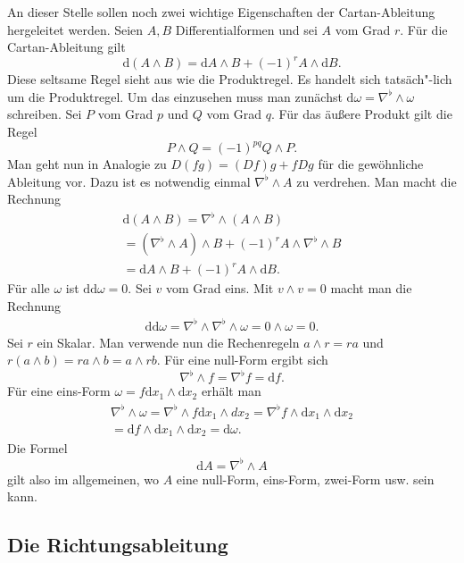 \documentclass[a4paper,10pt,fleqn,twocolumn,twoside]{article}
\begin{document}
An dieser Stelle sollen noch zwei wichtige Eigenschaften der
Cartan-Ableitung hergeleitet werden. Seien \(A,B\) Differentialformen
und sei \(A\) vom Grad \(r\). Für die Cartan-Ableitung gilt
\[\mathrm d(A\wedge B)
= \mathrm dA\wedge B + (-1)^r A\wedge \mathrm dB.\]
Diese seltsame Regel sieht aus wie die Produktregel. Es handelt
sich tatsäch"-lich um die Produktregel. Um das einzusehen muss man
zunächst \(\mathrm d\omega = \nabla^\flat\wedge\omega\) schreiben.
Sei \(P\) vom Grad \(p\) und \(Q\) vom Grad \(q\). Für das
äußere Produkt gilt die Regel
\[P\wedge Q = (-1)^{pq}Q\wedge P.\]
Man geht nun in Analogie zu \(D(fg)=(Df)g+fDg\) für die gewöhnliche
Ableitung vor. Dazu ist es notwendig einmal \(\nabla^\flat\wedge A\)
zu verdrehen. Man macht die Rechnung
\begin{gather*}
\mathrm d(A\wedge B) = \nabla^\flat\wedge (A\wedge B)\\
= (\nabla^\flat\wedge A)\wedge B
+ (-1)^r A\wedge\nabla^\flat\wedge B\\
= \mathrm dA\wedge B + (-1)^r A\wedge \mathrm dB.
\end{gather*}
Für alle \(\omega\) ist \(\mathrm {dd}\omega=0\).
Sei \(v\) vom Grad eins.
Mit \(v\wedge v=0\) macht man die Rechnung
\begin{gather*}
\mathrm{dd}\omega
= \nabla^\flat\wedge\nabla^\flat\wedge\omega
= 0\wedge\omega = 0.
\end{gather*}
Sei \(r\) ein Skalar. Man verwende nun die Rechenregeln \(a\wedge r=ra\) und
\(r(a\wedge b) = ra\wedge b = a\wedge rb\). Für eine null-Form ergibt sich
\[\nabla^\flat\wedge f = \nabla^\flat f = \mathrm df.\]
Für eine eins-Form \(\omega = f\mathrm dx_1\wedge\mathrm dx_2\)
erhält man
\begin{gather*}
\nabla^\flat\wedge\omega = \nabla^\flat\wedge f\mathrm dx_1\wedge dx_2
= \nabla^\flat f\wedge\mathrm dx_1\wedge\mathrm dx_2\\
= \mathrm df\wedge\mathrm dx_1\wedge\mathrm dx_2
= \mathrm d\omega.
\end{gather*}
Die Formel
\[\mathrm dA = \nabla^\flat\wedge A\]
gilt also im allgemeinen, wo \(A\) eine null-Form, eins-Form,
zwei-Form usw. sein kann.

\subsection{Die Richtungsableitung}
\end{document}
